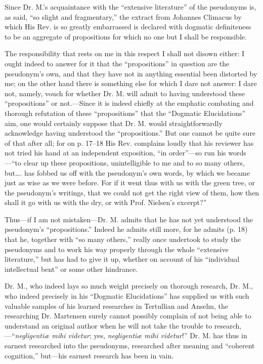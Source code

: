 \documentclass[12pt,a4paper,openany]{book}
\newcommand{\opage}[1]{\marginnote{\footnotesize\textit{[#1]}}}
\begin{document}
Since Dr. M.'s acquaintance with the ``extensive literature''
of the pseudonyms is, as said, ``so slight and fragmentary,''
the extract from Johannes Climacus by which His
Rev. is so greatly embarrassed is declared with dogmatic definiteness
to be an aggregate of propositions for which no one but
I shall be responsible.

The responsibility that rests on me in this respect I
shall not disown either: I ought indeed to answer
for it that the ``propositions'' in question are the pseudonym's own,
and that they have not in anything essential been distorted by me; on the other hand
there is something else for which I dare not answer:
I dare not, namely, vouch for whether Dr. M. will admit to
having understood these ``propositions'' or not.---Since it is indeed chiefly
at the emphatic combating and thorough refutation
of these ``propositions'' that the ``Dogmatic Elucidations''
aim, one would certainly suppose that Dr. M.
would straightforwardly acknowledge having understood the ``propositions.''
But one cannot be quite sure of that after all; for on p. 17--18 His Rev. complains loudly that his
reviewer has not tried his hand at an independent exposition,
``in order''---so run his words---``to clear up these propositions, unintelligible to me
and to so many others, but\dots{}.
has fobbed us off with the pseudonym's own words, by which
we became just as wise as we were before. For if it
went thus with us with the green tree, or the pseudonym's
\setcounter{footnote}{0}%
\opage{12}writings, that we could not get the right view of them, how
then shall it go with us with the dry, or with Prof.
Nielsen's excerpt?''

Thus---if I am not mistaken---Dr. M. admits that
he has not yet understood the pseudonym's ``propositions.''
Indeed he admits still more, for he admits (p. 18)
that he, together with ``so many others,'' really once
undertook to study the pseudonyms and to work his way properly
through the whole ``extensive literature,'' but has
had to give it up, whether on account of his ``individual
intellectual bent'' or some other hindrance.

Dr. M., who indeed lays so much weight precisely on
thorough research, Dr. M., who indeed precisely in his ``Dogmatic
Elucidations'' has supplied us with such valuable samples of
his learned researches in Tertullian and Anselm, the researching
Dr. Martensen surely cannot possibly complain of not
being able to understand an original author when he will not take
the trouble to research,---``\textit{negligentiæ mihi videtur};
yes, \textit{negligentiæ mihi videtur}!'' Dr. M. has thus in earnest
researched into the pseudonyms, researched after meaning and ``coherent
cognition,'' but---his earnest research
has been in vain.
\end{document}
